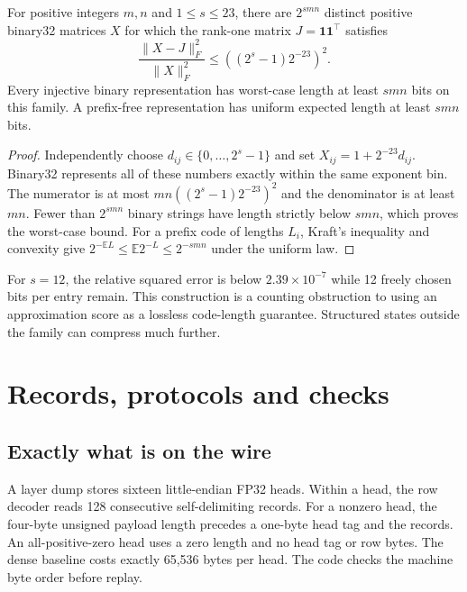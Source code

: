 \begin{theorem}\label{th:rank}
For positive integers $m,n$ and $1\le s\le23$, there are $2^{smn}$ distinct positive binary32 matrices $X$ for which the rank-one matrix $J=\mathbf1\mathbf1^\top$ satisfies
\[
 \frac{\lVert X-J\rVert_F^2}{\lVert X\rVert_F^2}
 \le ((2^s-1)2^{-23})^2 .
\]
Every injective binary representation has worst-case length at least $smn$ bits on this family. A prefix-free representation has uniform expected length at least $smn$ bits.
\end{theorem}
\begin{proof}
Independently choose $d_{ij}\in\{0,\ldots,2^s-1\}$ and set $X_{ij}=1+2^{-23}d_{ij}$. Binary32 represents all of these numbers exactly within the same exponent bin. The numerator is at most $mn((2^s-1)2^{-23})^2$ and the denominator is at least $mn$. Fewer than $2^{smn}$ binary strings have length strictly below $smn$, which proves the worst-case bound. For a prefix code of lengths $L_i$, Kraft's inequality and convexity give $2^{-\mathbb E L}\le \mathbb E2^{-L}\le2^{-smn}$ under the uniform law.
\end{proof}
For $s=12$, the relative squared error is below $2.39\times10^{-7}$ while 12 freely chosen bits per entry remain. This construction is a counting obstruction to using an approximation score as a lossless code-length guarantee. Structured states outside the family can compress much further.

\section{Records, protocols and checks}\label{app:experiment}
\subsection{Exactly what is on the wire}
A layer dump stores sixteen little-endian FP32 heads. Within a head, the row decoder reads 128 consecutive self-delimiting records. For a nonzero head, the four-byte unsigned payload length precedes a one-byte head tag and the records. An all-positive-zero head uses a zero length and no head tag or row bytes. The dense baseline costs exactly 65,536 bytes per head. The code checks the machine byte order before replay.

